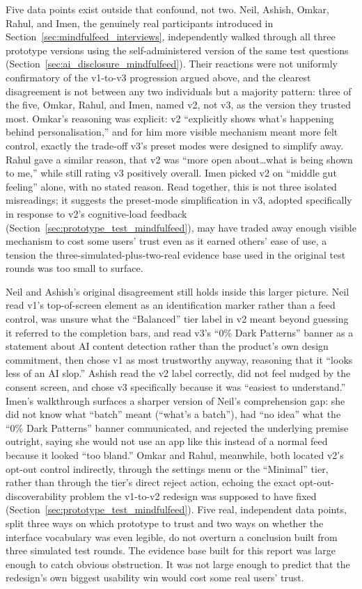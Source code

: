 \documentclass[11pt]{article}
\begin{document}
Five data points exist outside that confound, not two. Neil, Ashish, Omkar, Rahul, and Imen, the genuinely real participants introduced in Section~\ref{sec:mindfulfeed_interviews}, independently walked through all three prototype versions using the self-administered version of the same test questions (Section~\ref{sec:ai_disclosure_mindfulfeed}). Their reactions were not uniformly confirmatory of the v1-to-v3 progression argued above, and the clearest disagreement is not between any two individuals but a majority pattern: three of the five, Omkar, Rahul, and Imen, named v2, not v3, as the version they trusted most. Omkar's reasoning was explicit: v2 ``explicitly shows what's happening behind personalisation,'' and for him more visible mechanism meant more felt control, exactly the trade-off v3's preset modes were designed to simplify away. Rahul gave a similar reason, that v2 was ``more open about\ldots what is being shown to me,'' while still rating v3 positively overall. Imen picked v2 on ``middle gut feeling'' alone, with no stated reason. Read together, this is not three isolated misreadings; it suggests the preset-mode simplification in v3, adopted specifically in response to v2's cognitive-load feedback (Section~\ref{sec:prototype_test_mindfulfeed}), may have traded away enough visible mechanism to cost some users' trust even as it earned others' ease of use, a tension the three-simulated-plus-two-real evidence base used in the original test rounds was too small to surface.

Neil and Ashish's original disagreement still holds inside this larger picture. Neil read v1's top-of-screen element as an identification marker rather than a feed control, was unsure what the ``Balanced'' tier label in v2 meant beyond guessing it referred to the completion bars, and read v3's ``0\% Dark Patterns'' banner as a statement about AI content detection rather than the product's own design commitment, then chose v1 as most trustworthy anyway, reasoning that it ``looks less of an AI slop.'' Ashish read the v2 label correctly, did not feel nudged by the consent screen, and chose v3 specifically because it was ``easiest to understand.'' Imen's walkthrough surfaces a sharper version of Neil's comprehension gap: she did not know what ``batch'' meant (``what's a batch''), had ``no idea'' what the ``0\% Dark Patterns'' banner communicated, and rejected the underlying premise outright, saying she would not use an app like this instead of a normal feed because it looked ``too bland.'' Omkar and Rahul, meanwhile, both located v2's opt-out control indirectly, through the settings menu or the ``Minimal'' tier, rather than through the tier's direct reject action, echoing the exact opt-out-discoverability problem the v1-to-v2 redesign was supposed to have fixed (Section~\ref{sec:prototype_test_mindfulfeed}). Five real, independent data points, split three ways on which prototype to trust and two ways on whether the interface vocabulary was even legible, do not overturn a conclusion built from three simulated test rounds. The evidence base built for this report was large enough to catch obvious obstruction. It was not large enough to predict that the redesign's own biggest usability win would cost some real users' trust.
\end{document}
